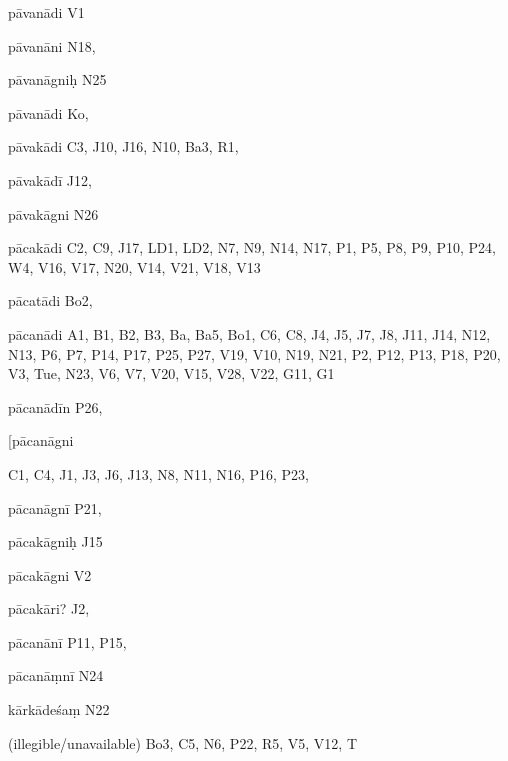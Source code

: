 \begin{ekdosis}
\begin{marma}[hp01_055]
\begin{marma}[hp02_009]
\begin{marma}[hp02_011]
 \begin{marma}[hp02_35a]
\item[pāvanādi] V1
\item[pāvanāni] N18,
\item[pāvanāgniḥ] N25
\item[pāvanādi] Ko,
\item[pāvakādi] C3, J10, J16, N10, Ba3, R1, 
\item[pāvakādī] J12,
\item[pāvakāgni] N26
\item[pācakādi] C2, C9, J17, LD1, LD2, N7, N9, N14, N17, P1, P5, P8, P9, P10, P24, W4, V16, V17, N20, V14, V21, V18, V13
\item[pācatādi] Bo2, 
\item[pācanādi] A1, B1, B2, B3, Ba, Ba5, Bo1, C6, C8, J4, J5, J7, J8, J11, J14, N12, N13, P6, P7, P14, P17, P25, P27, V19, V10, N19, N21, P2, P12, P13, P18, P20, V3, Tue, N23, V6, V7, V20, V15, V28, V22, G11, G1
\item[pācanādīn P26, 
\item[pācanāgni] C1, C4, J1, J3, J6, J13, N8, N11, N16, P16, P23, 
\item[pācanāgnī] P21,
\item[pācakāgniḥ] J15
\item[pācakāgni] V2
\item[pācakāri?] J2,
\item[pācanānī] P11, P15, 
\item[pācanāṃnī] N24
\item[kārkādeśaṃ] N22
\item[(illegible/unavailable)] Bo3, C5, N6, P22, R5, V5, V12, T
  \begin{description}

    \end{description}
 \end{marma}


\end{marma}
\end{marma}
\end{marma}
\end{ekdosis}
